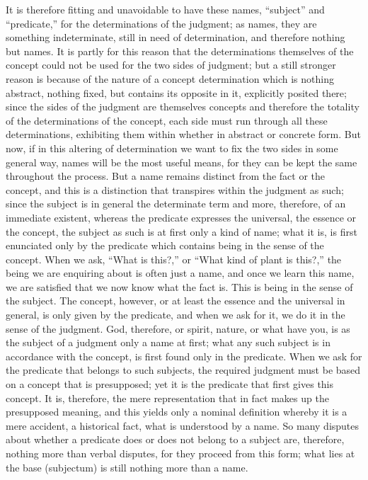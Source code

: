 It is therefore fitting and unavoidable to have these names,
“subject” and “predicate,” for the determinations of the judgment;
as names, they are something indeterminate, still in need of determination,
and therefore nothing but names.
It is partly for this reason that the determinations themselves
of the concept could not be used for the two sides of judgment;
but a still stronger reason is because of the nature of a concept determination
which is nothing abstract, nothing fixed,
but contains its opposite in it,
explicitly posited there;
since the sides of the judgment are themselves concepts
and therefore the totality of the determinations of the concept,
each side must run through all these determinations,
exhibiting them within whether in abstract or concrete form.
But now, if in this altering of determination
we want to fix the two sides in some general way,
names will be the most useful means,
for they can be kept the same throughout the process.
But a name remains distinct from the fact or the concept,
and this is a distinction that transpires within the judgment as such;
since the subject is in general the determinate term and more,
therefore, of an immediate existent,
whereas the predicate expresses the universal,
the essence or the concept, the subject as such is
at first only a kind of name;
what it is, is first enunciated only by the predicate
which contains being in the sense of the concept.
When we ask, “What is this?,” or “What kind of plant is this?,”
the being we are enquiring about is often just a name,
and once we learn this name, we are satisfied
that we now know what the fact is.
This is being in the sense of the subject.
The concept, however, or at least the essence and
the universal in general, is only given by the predicate,
and when we ask for it, we do it in the sense of the judgment.
God, therefore, or spirit, nature, or what have you, is
as the subject of a judgment only a name at first;
what any such subject is in accordance with the concept,
is first found only in the predicate.
When we ask for the predicate that belongs to such subjects,
the required judgment must be based on
a concept that is presupposed;
yet it is the predicate that first gives this concept.
It is, therefore, the mere
representation that in fact makes up the presupposed meaning,
and this yields only a nominal definition whereby it is a mere accident,
a historical fact, what is understood by a name.
So many disputes about whether a
predicate does or does not belong to a subject are, therefore, nothing more
than verbal disputes,
for they proceed from this form;
what lies at the base (subjectum) is
still nothing more than a name.

